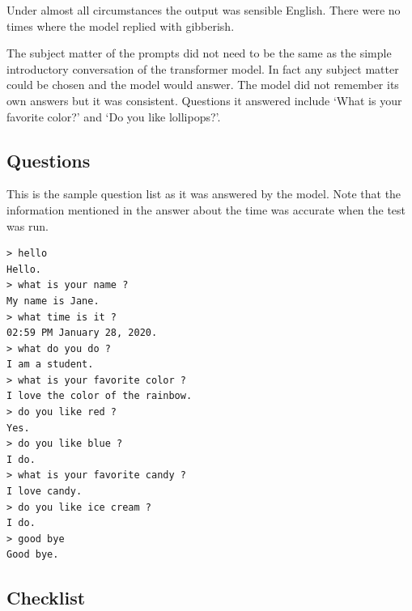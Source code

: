 Under almost all circumstances the output was sensible English. There were no times where the model replied with gibberish. 

The subject matter of the prompts did not need to be the same as the simple introductory conversation of the transformer model. In fact any subject matter could be chosen and the model would answer. The model did not remember its own answers but it was consistent. Questions it answered include `What is your favorite color?' and `Do you like lollipops?'. 

\subsection{Questions}
This is the sample question list as it was answered by the model. Note that the information mentioned in the answer about the time was accurate when the test was run.

\begin{verbatim}
> hello
Hello.
> what is your name ?
My name is Jane.
> what time is it ?
02:59 PM January 28, 2020.
> what do you do ?
I am a student.
> what is your favorite color ?
I love the color of the rainbow.
> do you like red ?
Yes.
> do you like blue ?
I do.
> what is your favorite candy ?
I love candy.
> do you like ice cream ?
I do. 
> good bye
Good bye.
\end{verbatim}

\subsection{Checklist}

